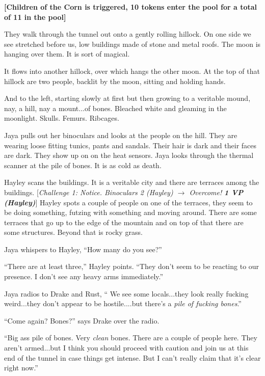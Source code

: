 \textbf{{[}Children of the Corn is triggered, 10 tokens enter the pool for a total of 11 in the pool{]}}



They walk through the tunnel out onto a gently rolling hillock.  On one side we see stretched before us, low buildings made of stone and metal roofs. The moon is hanging over them.  It is sort of magical.  



It flows into another hillock, over which hangs the other moon.  At the top of that hillock are two people, backlit by the moon, sitting and holding hands.  



And to the left, starting slowly at first but then growing to a veritable mound, nay, a hill, nay a mount...of bones.  Bleached white and gleaming in the moonlight.  Skulls.  Femurs.  Ribcages.



Jaya pulls out her binoculars and looks at the people on the hill.  They are wearing loose fitting tunics, pants and sandals.  Their hair is dark and their faces are dark.  They show up on on the heat sensors.  Jaya looks through the thermal scanner at the pile of bones.  It is as cold as death.

Hayley scans the buildings.  It is a veritable city and there are terraces among the buildings.  {[}\textit{Challenge 1: Notice.  Binoculars 2 (Hayley) $\rightarrow$ Overcome! }\textit{\textbf{1 VP (Hayley)}}{]}  Hayley spots a couple of people on one of the terraces, they seem to be doing something, futzing with something and moving around.  There are some terraces that go up to the edge of the mountain and on top of that there are some structures.  Beyond that is rocky grass.

Jaya whispers to Hayley, ``How many do you see?''

``There are at least three,'' Hayley points.  ``They don't seem to be reacting to our presence.  I don't see any heavy arms immediately.''



Jaya radios to Drake and Rust, `` We see some locals...they look really fucking weird...they don't appear to be hostile....but there's a \textit{pile of fucking bones}.''

``Come again?  Bones?'' says Drake over the radio.

``Big ass pile of bones.  Very \textit{clean }bones. There are a couple of people here.  They aren't armed...but I think you should proceed with caution and join us at this end of the tunnel in case things get intense.  But I can't really claim that it's clear right now.''


